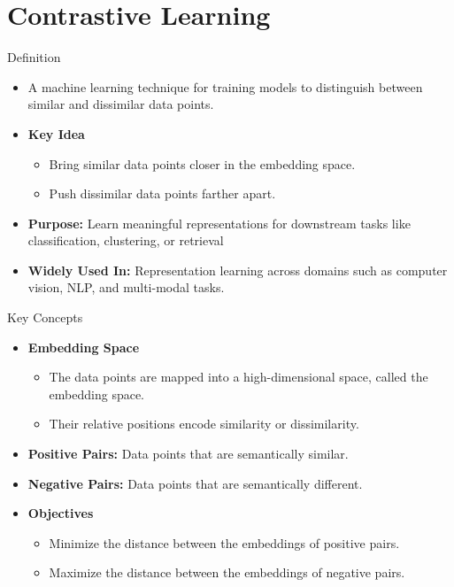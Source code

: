 \documentclass[serif, aspectratio=169]{beamer}
\begin{document}
\section{Contrastive Learning}


\begin{frame}{Definition}
    \begin{itemize}
        \item A machine learning technique for training models to distinguish between similar and dissimilar data points.

        \item \textbf{Key Idea}
        \begin{itemize}
            \item Bring similar data points closer in the embedding space.
            \item Push dissimilar data points farther apart.
        \end{itemize}

        \item \textbf{Purpose:} Learn meaningful representations for downstream tasks like classification, clustering, or retrieval
        \item \textbf{Widely Used In:} Representation learning across domains such as computer vision, NLP, and multi-modal tasks.
    \end{itemize}
\end{frame}


\begin{frame}{Key Concepts}
    \begin{itemize}
        \item \textbf{Embedding Space}
        \begin{itemize}
            \item The data points are mapped into a high-dimensional space, called the embedding space.
            \item Their relative positions encode similarity or dissimilarity.
        \end{itemize}
        
        \item \textbf{Positive Pairs:} Data points that are semantically similar.
        \item \textbf{Negative Pairs:} Data points that are semantically different.

        \item \textbf{Objectives}
        \begin{itemize}
            \item Minimize the distance between the embeddings of positive pairs.
            \item Maximize the distance between the embeddings of negative pairs.
        \end{itemize}
    \end{itemize}
\end{frame}
\end{document}
